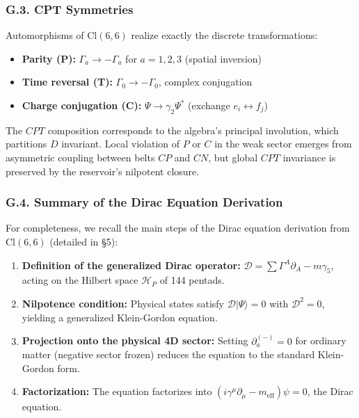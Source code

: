 \documentclass[11pt]{article}
\providecommand{\tightlist}{\setlength{\itemsep}{2pt}\setlength{\parskip}{6pt}}
\let\oldmathcal\mathcal
\renewcommand{\mathcal}[1]{\oldmathcal{#1}}
\providecommand{\tightlist}{%
  \setlength{\itemsep}{2pt}\setlength{\parskip}{6pt}
}
\begin{document}
\hypertarget{g.3.-cpt-symmetries}{%
\subsubsection{G.3. CPT Symmetries}\label{g.3.-cpt-symmetries}}

Automorphisms of \(\text{Cl}(6,6)\) realize exactly the discrete
transformations:

\begin{itemize}
\tightlist
\item
  \textbf{Parity (P):} \(\Gamma_a \to -\Gamma_a\) for \(a=1,2,3\)
  (spatial inversion)
\item
  \textbf{Time reversal (T):} \(\Gamma_0 \to -\Gamma_0\), complex
  conjugation
\item
  \textbf{Charge conjugation (C):} \(\Psi \to \gamma_2 \Psi^*\)
  (exchange \(e_i \leftrightarrow f_j\))
\end{itemize}

The \(CPT\) composition corresponds to the algebra's principal
involution, which partitions \(D\) invariant. Local violation of \(P\)
or \(C\) in the weak sector emerges from asymmetric coupling between
belts \(CP\) and \(CN\), but global \(CPT\) invariance is preserved by
the reservoir's nilpotent closure.

\hypertarget{g.4.-summary-of-the-dirac-equation-derivation}{%
\subsubsection{G.4. Summary of the Dirac Equation
Derivation}\label{g.4.-summary-of-the-dirac-equation-derivation}}

For completeness, we recall the main steps of the Dirac equation
derivation from \(\text{Cl}(6,6)\) (detailed in §5):

\begin{enumerate}
\def\labelenumi{\arabic{enumi}.}
\tightlist
\item
  \textbf{Definition of the generalized Dirac operator:}
  \(\mathcal{D} = \sum \Gamma^A \partial_A - m\gamma_5\), acting on the
  Hilbert space \(\mathcal{H}_P\) of 144 pentads.
\item
  \textbf{Nilpotence condition:} Physical states satisfy
  \(\mathcal{D}|\Psi\rangle = 0\) with \(\mathcal{D}^2 = 0\), yielding a
  generalized Klein-Gordon equation.
\item
  \textbf{Projection onto the physical 4D sector:} Setting
  \(\partial_a^{(-)} = 0\) for ordinary matter (negative sector frozen)
  reduces the equation to the standard Klein-Gordon form.
\item
  \textbf{Factorization:} The equation factorizes into
  \((i\gamma^\mu\partial_\mu - m_{\text{eff}})\psi = 0\), the Dirac
  equation.
\end{enumerate}
\end{document}
